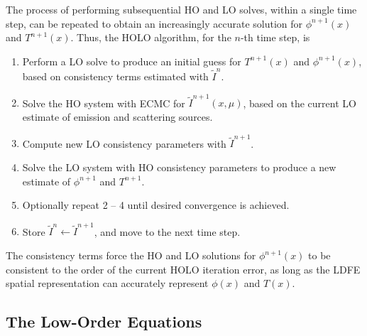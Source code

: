 \documentclass[11pt]{article}
\begin{document}
The process of performing subsequential HO and LO solves, within a single time step, can be repeated to obtain an increasingly accurate solution for $\phi^{n+1}(x)$ and $T^{n+1}(x)$.  Thus, the HOLO algorithm, for the $n$-th time step, is
\begin{enumerate}
\item Perform a LO solve to produce an initial guess for $T^{n+1}(x)$
    and $\phi^{n+1}(x)$, based on consistency terms estimated with $\tilde{I}^{n}$.
\item Solve the HO system with ECMC for $\tilde{I}^{n+1}(x,\mu)$, based on the current
    LO estimate of emission and scattering sources.%
\item Compute new LO consistency parameters with $\tilde{I}^{n+1}$.  
\item Solve the LO system with HO consistency parameters to produce a new
    estimate of $\phi^{n+1}$ and $T^{n+1}$.
\item Optionally repeat 2 -- 4 until desired convergence is achieved.
\item Store $\tilde{I}^{n}\leftarrow\tilde{I}^{n+1}$, and move to the next time step.
\end{enumerate}
The consistency terms force the HO
and LO solutions for $\phi^{n+1}(x)$ to be consistent to the order of the current HOLO
iteration error, as long as the LDFE spatial representation can accurately represent
$\phi(x)$ and $T(x)$.


\subsection{The Low-Order Equations}
\end{document}
